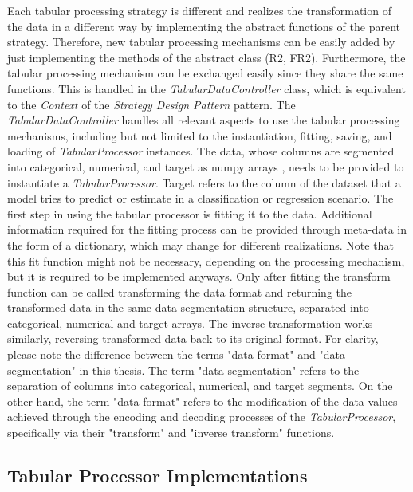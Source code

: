 Each tabular processing strategy is different and realizes the transformation of the data in a different way by implementing the abstract functions of the parent strategy.
Therefore, new tabular processing mechanisms can be easily added by just implementing the methods of the abstract class (R2, FR2).
Furthermore, the tabular processing mechanism can be exchanged easily since they share the same functions.
This is handled in the \textit{TabularDataController} class, which is equivalent to the \textit{Context} of the \textit{Strategy Design Pattern} pattern.
The \textit{TabularDataController} handles all relevant aspects to use the tabular processing mechanisms, including but not limited to the instantiation, fitting, saving, and loading of \textit{TabularProcessor} instances.
The data, whose columns are segmented into categorical, numerical, and target as numpy arrays \cite{harris2020array}, needs to be provided to instantiate a \textit{TabularProcessor}.
Target refers to the column of the dataset that a \gls{model} tries to predict or estimate in a classification or regression scenario.
The first step in using the tabular processor is fitting it to the data.
Additional information required for the fitting process can be provided through meta-data in the form of a dictionary, which may change for different realizations.
Note that this fit function might not be necessary, depending on the processing mechanism, but it is required to be implemented anyways.
Only after fitting the transform function can be called transforming the data format and returning the transformed data in the same data segmentation structure, \ie separated into categorical, numerical and target arrays.
The inverse transformation works similarly, reversing transformed data back to its original format.
For clarity, please note the difference between the terms "data format" and "data segmentation" in this thesis.
The term "data segmentation" refers to the separation of columns into categorical, numerical, and target segments.
On the other hand, the term "data format" refers to the modification of the data values achieved through the encoding and decoding processes of the \textit{TabularProcessor}, specifically via their "transform" and "inverse transform" functions.

\subsection{Tabular Processor Implementations}
\label{ch:architecture-tabularProcessor-implementations}

